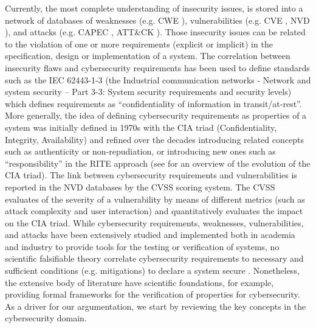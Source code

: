 \documentclass[conference]{IEEEtran}
\begin{document}
Currently, the most complete understanding of insecurity issues, is stored into
a network of databases of weaknesses (e.g.
CWE \autocite{MITRE2020CWEresearch}), vulnerabilities (e.g. CVE \autocite{CVE},
NVD \autocite{NIST2020NVD}), and attacks (e.g. CAPEC \autocite{MITRE2020CAPEC},
ATT\&CK \autocite{MITRE2020ATTACK}).  Those insecurity issues can be related to
the violation of one or more requirements (explicit or implicit) in the
specification, design or implementation of a system. The correlation 
between insecurity flaws and cybersecurity requirements has been used to define
standards such as the IEC 62443-1-3 (the Industrial communication networks -
Network and system security -- Part 3-3: System security requirements and
security levels) which defines requirements as ``confidentiality of information
in transit/at-rest''. More generally, the idea of defining cybersecurity requirements
as properties of a system was initially defined in 1970s with the 
CIA triad (Confidentiality, Integrity, Availability) and refined 
over the decades introducing related concepts such as authenticity or
non-repudiation, or introducing new ones such as ``responsibility'' in the
RITE approach (see \autocite{Samonas2014cia} for an overview of the evolution of the CIA triad).
The link between cybersecurity requirements and vulnerabilities is reported 
in the NVD databases by the CVSS \autocite{Mell2007CVSS} scoring system.
The CVSS evaluates of the severity of a vulnerability
by means of different metrics (such as attack complexity and user interaction)
and quantitatively evaluates the impact on the CIA triad.
While cybersecurity requirements, weaknesses, vulnerabilities, and attacks
have been extensively studied and implemented both in academia and industry
to provide tools for the testing or verification of systems, 
no scientific falsifiable theory correlate
cybersecurity requirements to necessary and sufficient conditions (e.g. mitigations) 
to declare a system secure \autocite{Herley2016unfalsifiability}.
Nonetheless, the extensive body of literature have scientific foundations,
for example, providing formal frameworks for the verification of 
properties %
for cybersecurity.
As a driver for our argumentation, we start by reviewing the key concepts
in the cybersecurity domain.
\end{document}
